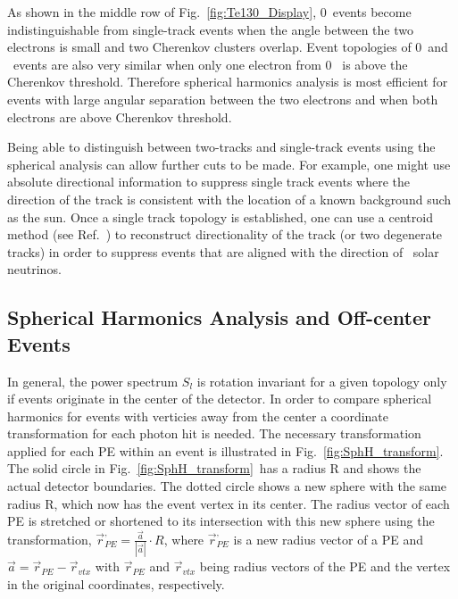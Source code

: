 As shown in the middle row of Fig.~\ref{fig:Te130_Display}, 0\nbb~events become indistinguishable from single-track events when the 
angle between the two electrons is small and two Cherenkov clusters overlap. Event topologies of 0\nbb~and \B~events are also 
very similar when only one electron from 0\nbb~ is above the Cherenkov threshold. Therefore spherical harmonics analysis is most 
efficient for events with large angular separation between the two electrons and when both electrons are above Cherenkov threshold.

Being able to distinguish between two-tracks and single-track events using the spherical analysis can allow further cuts to be made.  For example, one might use absolute directional information to suppress single track events where the direction of the track is consistent with the location of a known background such as the sun. Once a single track topology is established, one can use a centroid method (see Ref.~\cite{Directionality}) to reconstruct directionality of the track (or two degenerate tracks) in order to suppress events that are aligned with the direction of \B~solar neutrinos.


\subsection{Spherical Harmonics Analysis and Off-center Events}

In general, the power spectrum $S_l$ is rotation invariant for a given topology only if events originate in the center of the
detector. In order to compare spherical harmonics for events with verticies away from the center a coordinate transformation for each photon 
hit is needed. The necessary transformation applied for each PE within an event is illustrated in Fig.~\ref{fig:SphH_transform}. 
The solid circle in Fig.~\ref{fig:SphH_transform}~has a radius R and shows the actual detector boundaries. The dotted circle shows a new 
sphere with the same radius R, which now has the event vertex in its center. The radius vector of each PE is stretched or shortened to 
its intersection with this new sphere using the transformation, $\vec{r}^{,}_{PE} = \frac{\vec{a}}{|\vec{a}|} \cdot R$, 
where $\vec{r}^{,}_{PE}$ is a new radius vector of a PE and $\vec{a}=\vec{r}_{PE} - \vec{r}_{vtx}$ with $\vec{r}_{PE}$ and $\vec{r}_{vtx}$ 
being radius vectors of the PE and the vertex in the original coordinates, respectively.

